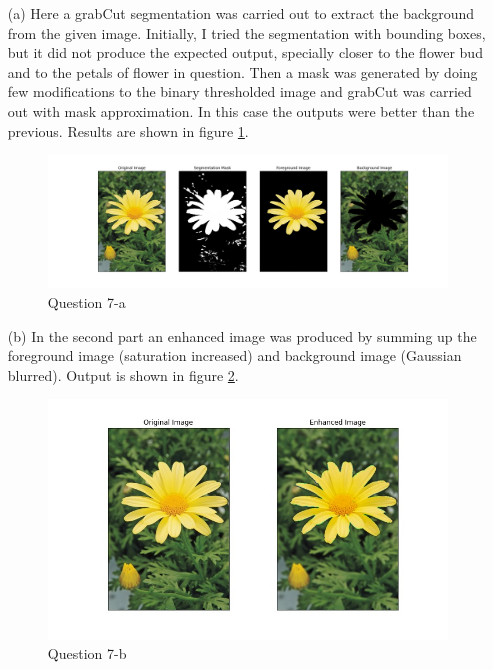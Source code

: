 \documentclass[11pt]{article}
\begin{document}
\begin{itemize}
    \item[(a)] Here a grabCut segmentation \cite{grabcut} was carried out to extract the background from the given image. Initially, I tried 
    the segmentation with bounding boxes, but it did not produce the expected output, specially closer to the flower bud and to the petals of flower 
    in question. Then a mask was generated by doing few modifications to the binary thresholded image and grabCut was carried out with mask approximation. 
    In this case the outputs were better than the previous. Results are shown in figure \ref{71}. 
                
    \begin{figure}[!h]
        \centering
        \includegraphics[width=\textwidth]{Images/71.jpg}
        \caption{Question 7-a}
        \label{71}
    \end{figure}

    \item[(b)] In the second part an enhanced image was produced by summing up the foreground image (saturation increased) and background image 
    (Gaussian blurred). Output is shown in figure \ref{72}. 
    
    \begin{figure}[!h]
        \centering
        \includegraphics[width=\textwidth]{Images/72.jpg}
        \caption{Question 7-b}
        \label{72}
    \end{figure}
        
\end{itemize} 
    
\newpage


\end{document}
